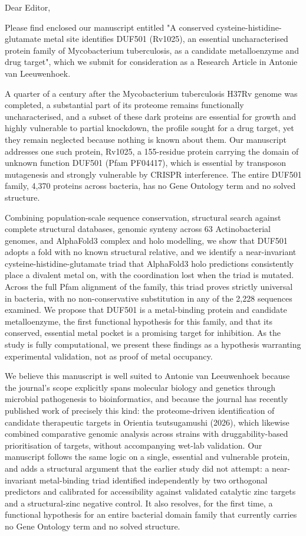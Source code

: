 \documentclass[11pt,a4paper]{article}
\begin{document}
Dear Editor,

Please find enclosed our manuscript entitled "A conserved cysteine-histidine-glutamate metal site identifies DUF501 (Rv1025), an essential uncharacterised protein family of Mycobacterium tuberculosis, as a candidate metalloenzyme and drug target", which we submit for consideration as a Research Article in Antonie van Leeuwenhoek.

A quarter of a century after the Mycobacterium tuberculosis H37Rv genome was completed, a substantial part of its proteome remains functionally uncharacterised, and a subset of these dark proteins are essential for growth and highly vulnerable to partial knockdown, the profile sought for a drug target, yet they remain neglected because nothing is known about them. Our manuscript addresses one such protein, Rv1025, a 155-residue protein carrying the domain of unknown function DUF501 (Pfam PF04417), which is essential by transposon mutagenesis and strongly vulnerable by CRISPR interference. The entire DUF501 family, 4,370 proteins across bacteria, has no Gene Ontology term and no solved structure.

Combining population-scale sequence conservation, structural search against complete structural databases, genomic synteny across 63 Actinobacterial genomes, and AlphaFold3 complex and holo modelling, we show that DUF501 adopts a fold with no known structural relative, and we identify a near-invariant cysteine-histidine-glutamate triad that AlphaFold3 holo predictions consistently place a divalent metal on, with the coordination lost when the triad is mutated. Across the full Pfam alignment of the family, this triad proves strictly universal in bacteria, with no non-conservative substitution in any of the 2,228 sequences examined. We propose that DUF501 is a metal-binding protein and candidate metalloenzyme, the first functional hypothesis for this family, and that its conserved, essential metal pocket is a promising target for inhibition. As the study is fully computational, we present these findings as a hypothesis warranting experimental validation, not as proof of metal occupancy.

We believe this manuscript is well suited to Antonie van Leeuwenhoek because the journal's scope explicitly spans molecular biology and genetics through microbial pathogenesis to bioinformatics, and because the journal has recently published work of precisely this kind: the proteome-driven identification of candidate therapeutic targets in Orientia tsutsugamushi (2026), which likewise combined comparative genomic analysis across strains with druggability-based prioritisation of targets, without accompanying wet-lab validation. Our manuscript follows the same logic on a single, essential and vulnerable protein, and adds a structural argument that the earlier study did not attempt: a near-invariant metal-binding triad identified independently by two orthogonal predictors and calibrated for accessibility against validated catalytic zinc targets and a structural-zinc negative control. It also resolves, for the first time, a functional hypothesis for an entire bacterial domain family that currently carries no Gene Ontology term and no solved structure.
\end{document}
